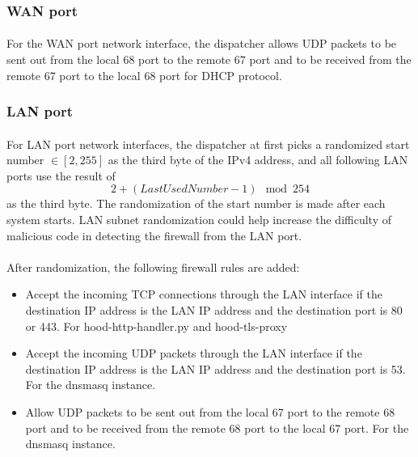\documentclass[mscthesis]{usiinfthesis}
\begin{document}
\subsubsection{WAN port}
\paragraph{}
For the WAN port network interface, the dispatcher allows UDP packets to be sent out from the local 68 port to the remote 67 port and to be received from the remote 67 port to the local 68 port for DHCP protocol.
\subsubsection{LAN port}
\paragraph{}
For LAN port network interfaces, the dispatcher at first picks a randomized start number \(\in [2, 255]\) as the third byte of the IPv4 address, and all following LAN ports use the result of \[2 + (Last Used Number - 1) \mod 254\] as the third byte. The randomization of the start number is made after each system starts. LAN subnet randomization could help increase the difficulty of malicious code in detecting the firewall from the LAN port.
\paragraph{}
After randomization, the following firewall rules are added:
\begin{itemlist}[H]
  \begin{itemize}
    \item Accept the incoming TCP connections through the LAN interface if the destination IP address is the LAN IP address and the destination port is 80 or 443. For hood-http-handler.py and hood-tls-proxy
    \item Accept the incoming UDP packets through the LAN interface if the destination IP address is the LAN IP address and the destination port is 53. For the dnsmasq instance.
    \item Allow UDP packets to be sent out from the local 67 port to the remote 68 port and to be received from the remote 68 port to the local 67 port. For the dnsmasq instance.
  \end{itemize}
  \label{lst:LAN-rules}
\end{itemlist}
\end{document}
